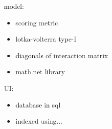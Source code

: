 model:
\begin{itemize}
    \item scoring metric

    \item lotka-volterra type-I
    \item diagonals of interaction matrix
    \item math.net library
\end{itemize}

UI:
\begin{itemize}
    \item database in sql
    \item indexed using...
\end{itemize}
